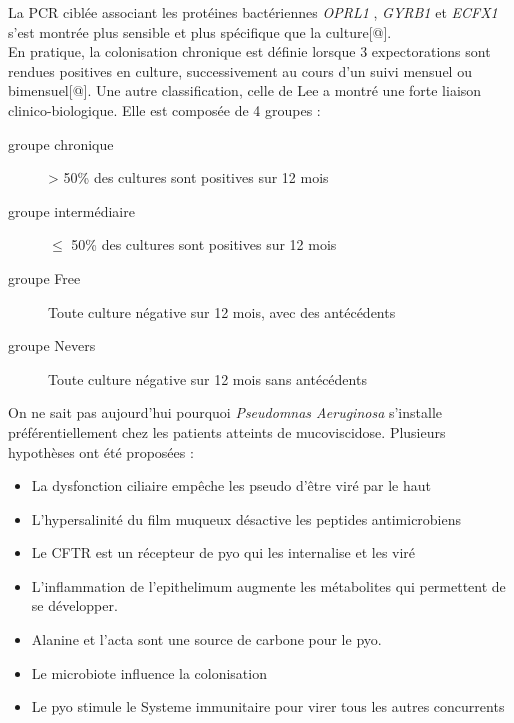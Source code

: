 \documentclass[12pt,a4paper]{article}
\begin{document}
La PCR ciblée associant les protéines bactériennes \textit{OPRL1} , \textit{GYRB1} et \textit{ECFX1}  s’est montrée plus sensible et plus spécifique que la culture[@]. \\
En pratique, la colonisation chronique est définie lorsque 3 expectorations sont rendues positives en culture, successivement au cours d’un suivi mensuel ou bimensuel[@].
Une autre classification, celle de Lee a montré une forte liaison clinico-biologique. Elle est composée de 4 groupes :  
\begin{description}
\item[groupe chronique] > 50\% des cultures sont positives sur 12 mois
\item[groupe intermédiaire] $\leq$ 50\% des cultures sont positives sur  12 mois
\item[groupe Free] Toute culture négative sur 12 mois, avec des antécédents
\item[groupe Nevers] Toute culture négative sur 12 mois sans antécédents 
\end{description}

On ne sait pas aujourd’hui pourquoi \textit{Pseudomnas Aeruginosa} s’installe préférentiellement chez les patients atteints de mucoviscidose. Plusieurs hypothèses ont été proposées : 

\begin{itemize}
\item La dysfonction ciliaire empêche les pseudo d’être viré par le haut
\item L’hypersalinité du film muqueux désactive les peptides antimicrobiens
\item Le CFTR est un récepteur de pyo qui les internalise et les viré
\item L’inflammation de  l’epithelimum augmente les métabolites qui permettent de se développer.
\item Alanine et l’acta sont une source de carbone pour le pyo.
\item Le microbiote influence la colonisation
\item Le pyo stimule le Systeme immunitaire pour virer tous les autres concurrents 
\end{itemize}
\end{document}
